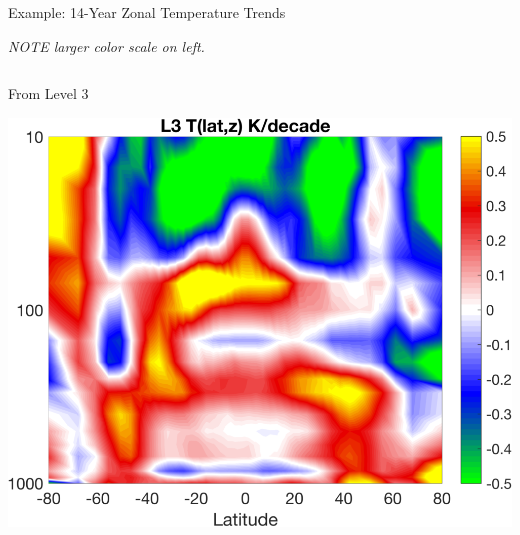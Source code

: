 \documentclass[10pt,t]{beamer}
\begin{document}
\begin{frame}[label={sec:orgfb121a1}]{Example: 14-Year Zonal Temperature Trends}
\vspace{-0.1in}

\small \emph{NOTE larger color scale on left.}

\vspace{-0.1in}

\begin{columns}
\begin{column}{0.55\columnwidth}
\begin{block}{\footnotesize From Level 3}
\begin{center}
\includegraphics[width=\linewidth]{./oFigs/final_l3_t.png}
\end{center}
\end{block}
\end{column}


\end{columns}
\end{frame}
\end{document}
